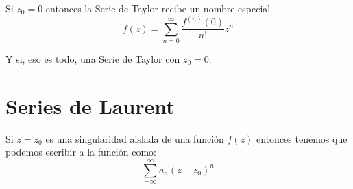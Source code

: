 \documentclass[12pt, fleqn]{report}                             %
\begin{document}
            Si $z_0 = 0$ entonces la Serie de Taylor recibe un nombre especial
            \begin{equation*}
                f(z) = \sum_{n=0}^\infty \dfrac{f^{(n)}(0)}{n!} z^n
            \end{equation*}

            Y si, eso es todo, una Serie de Taylor con $z_0 = 0$. 






        \clearpage
        \section{Series de Laurent}

            Si $z = z_0$ es una singularidad aislada de una función $f(z)$ entonces tenemos
            que podemos escribir a la función como:
            \begin{equation*}
                \sum_{-\infty}^\infty a_{n}(z - z_0)^n
            \end{equation*}
\end{document}
